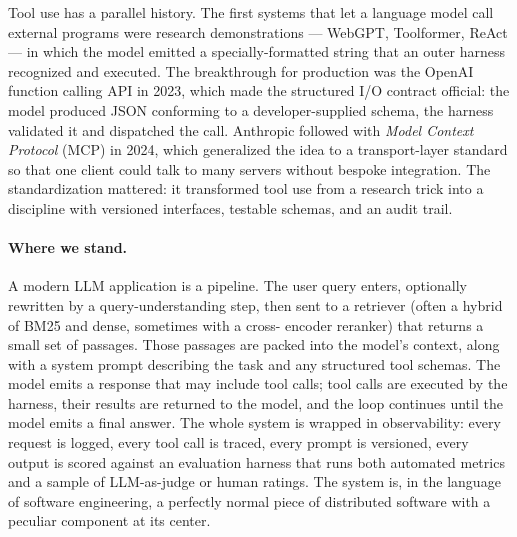 Tool use has a parallel history. The first systems that let a
language model call external programs were research demonstrations
--- WebGPT, Toolformer, ReAct --- in which the model emitted a
specially-formatted string that an outer harness recognized and
executed. The breakthrough for production was the OpenAI function
calling API in 2023, which made the structured I/O contract
official: the model produced JSON conforming to a developer-supplied
schema, the harness validated it and dispatched the call. Anthropic
followed with \emph{Model Context Protocol} (MCP) in 2024, which
generalized the idea to a transport-layer standard so that one
client could talk to many servers without bespoke integration. The
standardization mattered: it transformed tool use from a research
trick into a discipline with versioned interfaces, testable
schemas, and an audit trail.

\paragraph{Where we stand.}
A modern LLM application is a pipeline. The user query enters,
optionally rewritten by a query-understanding step, then sent to a
retriever (often a hybrid of BM25 and dense, sometimes with a cross-
encoder reranker) that returns a small set of passages. Those
passages are packed into the model's context, along with a system
prompt describing the task and any structured tool schemas. The
model emits a response that may include tool calls; tool calls are
executed by the harness, their results are returned to the model,
and the loop continues until the model emits a final answer. The
whole system is wrapped in observability: every request is logged,
every tool call is traced, every prompt is versioned, every output
is scored against an evaluation harness that runs both automated
metrics and a sample of LLM-as-judge or human ratings. The system
is, in the language of software engineering, a perfectly normal
piece of distributed software with a peculiar component at its
center.

